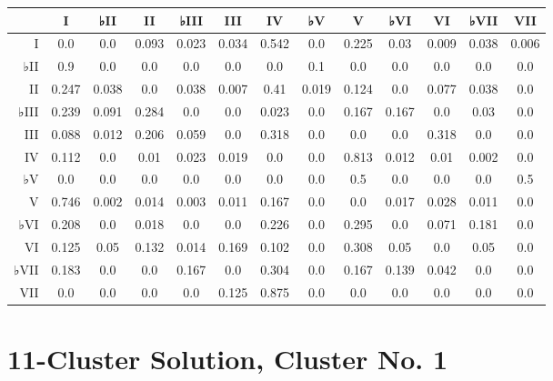\begin{table}[htbp]
\begin{minipage}{\linewidth}
\setlength{\tymax}{0.5\linewidth}
\centering
\small
\begin{tabulary}{\textwidth}{@{}RCCCCCCCCCCCC@{}} \toprule
&I&♭II&II&♭III&III&IV&♭V&V&♭VI&VI&♭VII&VII\\
\midrule
I&0.0&0.0&0.093&0.023&0.034&0.542&0.0&0.225&0.03&0.009&0.038&0.006\\
♭II&0.9&0.0&0.0&0.0&0.0&0.0&0.1&0.0&0.0&0.0&0.0&0.0\\
II&0.247&0.038&0.0&0.038&0.007&0.41&0.019&0.124&0.0&0.077&0.038&0.0\\
♭III&0.239&0.091&0.284&0.0&0.0&0.023&0.0&0.167&0.167&0.0&0.03&0.0\\
III&0.088&0.012&0.206&0.059&0.0&0.318&0.0&0.0&0.0&0.318&0.0&0.0\\
IV&0.112&0.0&0.01&0.023&0.019&0.0&0.0&0.813&0.012&0.01&0.002&0.0\\
♭V&0.0&0.0&0.0&0.0&0.0&0.0&0.0&0.5&0.0&0.0&0.0&0.5\\
V&0.746&0.002&0.014&0.003&0.011&0.167&0.0&0.0&0.017&0.028&0.011&0.0\\
♭VI&0.208&0.0&0.018&0.0&0.0&0.226&0.0&0.295&0.0&0.071&0.181&0.0\\
VI&0.125&0.05&0.132&0.014&0.169&0.102&0.0&0.308&0.05&0.0&0.05&0.0\\
♭VII&0.183&0.0&0.0&0.167&0.0&0.304&0.0&0.167&0.139&0.042&0.0&0.0\\
VII&0.0&0.0&0.0&0.0&0.125&0.875&0.0&0.0&0.0&0.0&0.0&0.0\\

\bottomrule

\end{tabulary}
\end{minipage}
\end{table}

\section{11-Cluster Solution, Cluster No. 1}
\label{11-clustersolutionclusterno.1}

